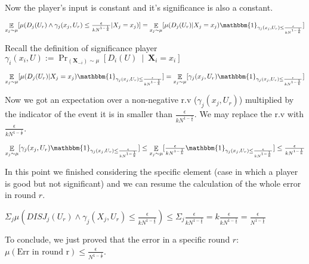 \documentclass{article}
\newcommand{\coloneq}{:=}
\newcommand{\given}{\medspace \middle| \medspace}
\newcommand{\rv}[1]{\mathbf{#1}}
\theoremstyle{plain}
\begin{document}
Now the player's input is constant and it's significance is also a constant. \newline

$\underset{x_j \sim \mu}{\mathop{\mathbb{E}}}[\mu(D_j(U_r) \land \gamma_j(x_j, U_r) \leq \frac{\epsilon}{kN^{1-\frac{1}{k}}} | X_j = x_j)] = \underset{x_j \sim \mu}{\mathop{\mathbb{E}}}[\mu(D_j(U_r) | X_j = x_j) \mathbbm{1}_{\gamma_j(x_j, U_r) \leq \frac{\epsilon}{kN^{1-\frac{1}{k}}}}]$ \newline

Recall the definition of significance player $\gamma_i(x_i, U) \coloneq \Pr_{(\rv{X}_{-i}) \sim \mu}\left[D_i (U) \given \rv{X}_i = x_i \right]$ \newline

$\underset{x_j \sim \mu}{\mathop{\mathbb{E}}}[\mu(D_j(U_r) | X_j = x_j) \mathbbm{1}_{\gamma_j(x_j, U_r) \leq \frac{\epsilon}{kN^{1-\frac{1}{k}}}}] = \underset{x_j \sim \mu}{\mathop{\mathbb{E}}}[\gamma_j(x_j, U_r) \mathbbm{1}_{\gamma_j(x_j, U_r) \leq \frac{\epsilon}{kN^{1-\frac{1}{k}}}}]$ \newline

Now we got an expectation over a non-negative r.v ($\gamma_j(x_j, U_r)$) multiplied by the indicator of the event it is in smaller than $\frac{\epsilon}{kN^{1-\frac{1}{k}}}$. We may replace the r.v with $\frac{\epsilon}{kN^{1-\frac{1}{k}}}$. \newline

$\underset{x_j \sim \mu}{\mathop{\mathbb{E}}}[\gamma_j(x_j, U_r) \mathbbm{1}_{\gamma_j(x_j, U_r) \leq \frac{\epsilon}{kN^{1-\frac{1}{k}}}}] \leq \underset{x_j \sim \mu}{\mathop{\mathbb{E}}}[\frac{\epsilon}{kN^{1-\frac{1}{k}}} \mathbbm{1}_{\gamma_j(x_j, U_r) \leq \frac{\epsilon}{kN^{1-\frac{1}{k}}}}] \leq \frac{\epsilon}{kN^{1-\frac{1}{k}}}$ \newline

In this point we finished considering the specific element (case in which a player is good but not significant) and we can resume the calculation of the whole error in round $r$.  \newline

$\Sigma_j \mu(DISJ_j(U_r) \land \gamma_j(X_j, U_r) \leq \frac{\epsilon}{kN^{1-\frac{1}{k}}}) \leq \Sigma_j \frac{\epsilon}{kN^{1-\frac{1}{k}}} = k\frac{\epsilon}{kN^{1-\frac{1}{k}}} = \frac{\epsilon}{N^{1-\frac{1}{k}}}$
\newline

To conclude, we just proved that the error in a specific round $r$:
$\mu(\text{Err in round r}) \leq \frac{\epsilon}{N^{1-\frac{1}{k}}}$.\newline
\end{document}
